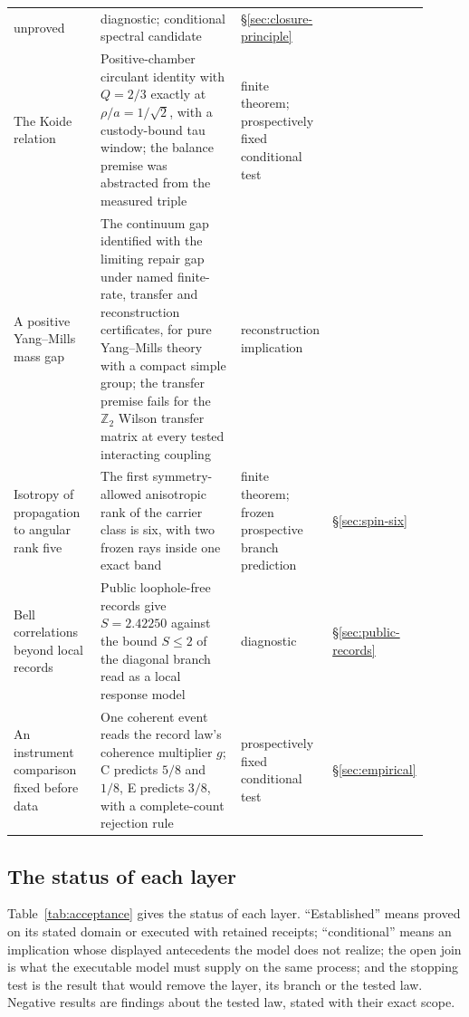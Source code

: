 \documentclass[11pt]{article}
\theoremstyle{definition}
\theoremstyle{remark}
\begin{document}
{\begin{longtable}{@{}L{0.23\linewidth}L{0.46\linewidth}L{0.14\linewidth}L{0.08\linewidth}@{}}
unproved & diagnostic; conditional spectral candidate &
\S\ref{sec:closure-principle}\\
The Koide relation & Positive-chamber circulant identity with $Q=2/3$
exactly at $\rho/a=1/\sqrt2$, with a custody-bound tau window; the balance
premise was abstracted from the measured triple & finite
theorem; prospectively fixed conditional test & \cite{ophkoide}\\
A positive Yang--Mills mass gap & The continuum gap identified with the
limiting repair gap under named finite-rate, transfer and reconstruction
certificates, for pure Yang--Mills theory with a compact simple group; the
transfer premise fails for the $\mathbb Z_2$ Wilson transfer matrix at every
tested interacting coupling & reconstruction implication & \cite{ophyangmills}\\
Isotropy of propagation to angular rank five & The first symmetry-allowed
anisotropic rank of the carrier class is six, with two frozen rays inside
one exact band & finite theorem; frozen prospective branch prediction & \S\ref{sec:spin-six}\\
Bell correlations beyond local records & Public loophole-free records give
$S=2.42250$ against the bound $S\le2$ of the diagonal branch read as a local
response model & diagnostic & \S\ref{sec:public-records}\\
An instrument comparison fixed before data & One coherent event reads the
record law's coherence multiplier $g$; C predicts $5/8$ and $1/8$, E predicts $3/8$, with a
complete-count rejection rule & prospectively fixed conditional test & \S\ref{sec:empirical}\\*
\bottomrule
\end{longtable}
}

\subsection{The status of each layer}

Table~\ref{tab:acceptance} gives the status of each layer. ``Established''
means proved on its stated domain or executed with retained receipts;
``conditional'' means an implication whose displayed antecedents the model
does not realize; the open join is what the executable model must supply on
the same process; and the stopping test is the result that would remove the
layer, its branch or the tested law. Negative results are findings about
the tested law, stated with their exact scope.
\end{document}
